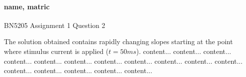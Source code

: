 \documentclass{article}
\begin{document}
  \paragraph{name, matric} BN5205 Assignment 1 Question 2

  The solution obtained contains rapidly changing slopes starting at the point 
  where stimulus current is applied ($t = 50ms$). content...  content...  
  content...  content...  content...  content...  
  content...  content...  content...  content...  content...  content...  
  content...  content...  content...  content...
\end{document}

